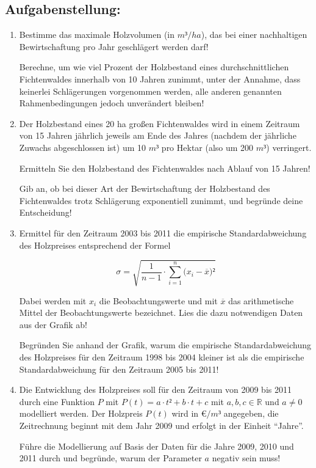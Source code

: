 \begin{langesbeispiel}
\subsection{Aufgabenstellung:}
\begin{enumerate}
	\item Bestimme das maximale Holzvolumen (in $m³/ha$), das bei einer nachhaltigen Bewirtschaftung pro Jahr geschlägert werden darf!
	
Berechne, um wie viel Prozent der Holzbestand eines durchschnittlichen Fichtenwaldes innerhalb von 10 Jahren zunimmt, unter der Annahme, dass keinerlei Schlägerungen vorgenommen werden, alle anderen genannten Rahmenbedingungen jedoch unverändert bleiben!

\item Der Holzbestand eines 20 ha großen Fichtenwaldes wird in einem Zeitraum von 15 Jahren jährlich jeweils am Ende des Jahres (nachdem der jährliche Zuwachs abgeschlossen ist) um 10 $m³$ pro Hektar (also um 200 $m³$) verringert.

Ermitteln Sie den Holzbestand des Fichtenwaldes nach Ablauf von 15 Jahren!

Gib an, ob bei dieser Art der Bewirtschaftung der Holzbestand des Fichtenwaldes trotz Schlägerung exponentiell zunimmt, und begründe deine Entscheidung!
	
\item Ermittel für den Zeitraum 2003 bis 2011 die empirische Standardabweichung des Holzpreises entsprechend der Formel

$$\sigma=\sqrt{\frac{1}{n-1}\cdot\sum^n_{i=1}({x_i-\overline{x})²}}$$

Dabei werden mit $x_i$ die Beobachtungswerte und mit $\overline{x}$ das arithmetische Mittel der Beobachtungswerte bezeichnet. Lies die dazu notwendigen Daten aus der Grafik ab!

Begründen Sie anhand der Grafik, warum die empirische Standardabweichung des
Holzpreises für den Zeitraum 1998 bis 2004 kleiner ist als die empirische Standardabweichung für den Zeitraum 2005 bis 2011!

\item Die Entwicklung des Holzpreises soll für den Zeitraum von 2009 bis 2011 durch eine Funktion $P$ mit $P(t)=a\cdot t²+b\cdot t+c$ mit $a,b,c\in\mathbb{R}$ und $a\neq 0$ modelliert werden. Der Holzpreis $P(t)$ wird in \euro$/m³$ angegeben, die Zeitrechnung beginnt mit dem Jahr 2009 und erfolgt in der Einheit "`Jahre"'.

Führe die Modellierung auf Basis der Daten für die Jahre 2009, 2010 und 2011 durch und begründe, warum der Parameter $a$ negativ sein muss!


\end{enumerate}
\end{langesbeispiel}
